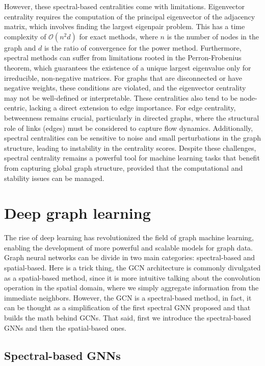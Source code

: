 However, these spectral-based centralities come with limitations. Eigenvector centrality requires the computation of the principal eigenvector of the adjacency matrix, which involves finding the largest eigenpair problem. This has a time complexity of $\mathcal{O}(n^2 d)$ for exact methods, where $n$ is the number of nodes in the graph and $d$ is the ratio of convergence for the power method. Furthermore, spectral methods can suffer from limitations rooted in the Perron-Frobenius theorem, which guarantees the existence of a unique largest eigenvalue only for irreducible, non-negative matrices. For graphs that are disconnected or have negative weights, these conditions are violated, and the eigenvector centrality may not be well-defined or interpretable. These centralities also tend to be node-centric, lacking a direct extension to edge importance. For edge centrality, betweenness remains crucial, particularly in directed graphs, where the structural role of links (edges) must be considered to capture flow dynamics. Additionally, spectral centralities can be sensitive to noise and small perturbations in the graph structure, leading to instability in the centrality scores. Despite these challenges, spectral centrality remains a powerful tool for machine learning tasks that benefit from capturing global graph structure, provided that the computational and stability issues can be managed.


\section{Deep graph learning}

The rise of deep learning has revolutionized the field of graph machine learning, enabling the development of more powerful and scalable models for graph data. Graph neural networks can be divide in two main categories: spectral-based and spatial-based. Here is a trick thing, the GCN architecture \cite{kipf2016semi} is commonly divulgated as a spatial-based method, since it is more intuitive talking about the convolution operation in the spatial domain, where we simply aggregate information from the immediate neighbors. However, the GCN is a spectral-based method, in fact, it can be thought as a simplification of the first spectral GNN \cite{bruna2013spectral} proposed and that builds the math behind GCNs. That said, first we introduce the spectral-based GNNs and then the spatial-based ones.

\subsection{Spectral-based GNNs}

